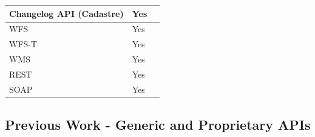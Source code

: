 \begin{table}[H]
\begin{tabular}{|l|l|l|}
		Changelog API (Cadastre)     & Yes                                                                       &                                                                                                                                                                                                                                             \\ \hline
		WFS                          & Yes                                                                       &                                                                                                                                                                                                                                             \\ \hline
		WFS-T                        & Yes                                                                       &                                                                                                                                                                                                                                             \\ \hline
		WMS                          & Yes                                                                       &                                                                                                                                                                                                                                             \\ \hline
		REST                         & Yes                                                                       &                                                                                                                                                                                                                                             \\ \hline
		SOAP                         & Yes                                                                       &                                                                                                                                                                                                                                             \\ \hline
	\end{tabular}
\end{table}


\subsection{Previous Work - Generic and Proprietary APIs}\label{generic}

